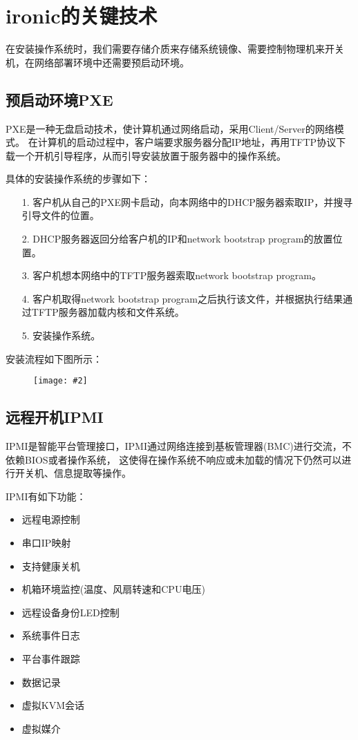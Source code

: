 \documentclass[a4paper,left=1.5cm,right=1.5cm,11pt]{article}
\newcommand{\sizedfic}[2]{\begin{figure}[H]
		\center
		\texttt{[image: \#2]}
	\end{figure}}
\begin{document}
\section{ironic的关键技术}
	在安装操作系统时，我们需要存储介质来存储系统镜像、需要控制物理机来开关机，在网络部署环境中还需要预启动环境。

\subsection{预启动环境PXE}
	PXE是一种无盘启动技术，使计算机通过网络启动，采用Client/Server的网络模式。
	在计算机的启动过程中，客户端要求服务器分配IP地址，再用TFTP协议下载一个开机引导程序，从而引导安装放置于服务器中的操作系统。\par

	具体的安装操作系统的步骤如下：
	\begin{itemize}
		\item[1.] 客户机从自己的PXE网卡启动，向本网络中的DHCP服务器索取IP，并搜寻引导文件的位置。
		\item[2.] DHCP服务器返回分给客户机的IP和network bootstrap program的放置位置。
		\item[3.] 客户机想本网络中的TFTP服务器索取network bootstrap program。
		\item[4.] 客户机取得network bootstrap program之后执行该文件，并根据执行结果通过TFTP服务器加载内核和文件系统。
		\item[5.] 安装操作系统。
	\end{itemize}

	安装流程如下图所示：
	\sizedfic{0.7}{2.jpg}

\subsection{远程开机IPMI}
	IPMI是智能平台管理接口，IPMI通过网络连接到基板管理器(BMC)进行交流，不依赖BIOS或者操作系统，
	这使得在操作系统不响应或未加载的情况下仍然可以进行开关机、信息提取等操作。\par

	IPMI有如下功能：
	\begin{itemize}
		\item 远程电源控制
		\item 串口IP映射
		\item 支持健康关机
		\item 机箱环境监控(温度、风扇转速和CPU电压)
		\item 远程设备身份LED控制
		\item 系统事件日志
		\item 平台事件跟踪
		\item 数据记录
		\item 虚拟KVM会话
		\item 虚拟媒介
	\end{itemize}
\end{document}
